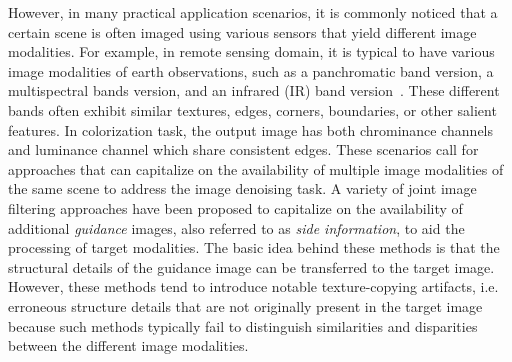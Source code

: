 \documentclass{article}
\begin{document}
However, in many practical application scenarios, it is commonly noticed that a certain scene is often imaged using various sensors that yield different image modalities. For example, in remote sensing domain, it is typical to have various image modalities of earth observations, such as a panchromatic band version, a multispectral bands version, and an infrared (IR) band version~\cite{gomez2015multimodal,loncan2015hyperspectral}. These different bands often exhibit similar textures, edges, corners, boundaries, or other salient features. 
In colorization\cite{levin2004colorization} task, the output image has both chrominance channels and luminance channel which share consistent edges. These scenarios call for approaches that can capitalize on the availability of multiple image modalities of the same scene to address the image denoising task.
%
A variety of joint image filtering approaches have been proposed to capitalize on the availability of additional \emph{guidance} images, also referred to as \emph{side information}\cite{renna2016classification,mota2017compressed}, to aid the processing of target modalities\cite{kopf2007joint,he2013guided,ham2017robust,li2016deep,shen2015multispectral,zhang2014rolling}. 
The basic idea behind these methods is that the structural details of the guidance image can be transferred to the target image. However, these methods tend to introduce notable texture-copying artifacts, i.e. erroneous structure details that are not originally present in the target image because such methods typically fail to distinguish similarities and disparities between the different image modalities. 
\end{document}
